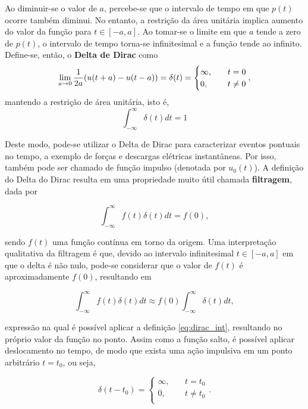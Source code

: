 \documentclass{article}
\numberwithin{equation}{section}
\begin{document}
\begin{itemize}
    Ao diminuir-se o valor de $a$, percebe-se que o intervalo de tempo em que $p(t)$ ocorre também diminui. No entanto, a restrição da área unitária implica aumento do valor da função para $t \in [-a,a]$. Ao tomar-se o limite em que $a$ tende a zero de $p(t)$, o intervalo de tempo torna-se infinitesimal e a função tende ao infinito.
    Define-se, então, o \textbf{Delta de Dirac} como
    \begin{equation}
        \operatornamewithlimits{lim}_{a \to 0} \dfrac{1}{2a}(u(t+a) - u(t-a)) = \delta(t) =
        \begin{cases}
            \infty, &\quad t=0 \\
            0, &\quad t\neq 0 \\
        \end{cases}, \label{eq:dirac_def}
    \end{equation}
    \noindent mantendo a restrição de área unitária, isto é,
    \begin{equation}
            \displaystyle{\int_{-\infty}^{\infty}{\delta(t)dt}} = 1 \label{eq:dirac_int}
    \end{equation}

    Deste modo, pode-se utilizar o Delta de Dirac para caracterizar eventos pontuais no tempo, a exemplo de forças e descargas elétricas instantâneas. Por isso, também pode ser chamado de função impulso (denotada por $u_0(t)$). A definição do Delta do Dirac resulta em uma propriedade muito útil chamada \textbf{filtragem}, dada por

    $$
        \displaystyle{\int_{-\infty}^{\infty}{f(t)\delta(t)dt}} = f(0),
    $$

    \noindent sendo $f(t)$ uma função contínua em torno da origem. Uma interpretação qualitativa da filtragem é que, devido ao intervalo infinitesimal $t \in [-a,a]$ em que o delta é não nulo, pode-se considerar que o valor de $f(t)$ é aproximadamente $f(0)$, resultando em

    $$
        \displaystyle{\int_{-\infty}^{\infty}{f(t)\delta(t)dt}} \approx
        f(0) \displaystyle{\int_{-\infty}^{\infty}{\delta(t)dt}},
    $$

    \noindent expressão na qual é possível aplicar a definição \eqref{eq:dirac_int}, resultando no próprio valor da função no ponto. Assim como a função salto, é possível aplicar deslocamento no tempo, de modo que exista uma ação impulsiva em um ponto arbitrário $t=t_0$, ou seja,

    $$\delta(t-t_0) =
        \begin{cases}
            \infty, &\quad t=t_0 \\
            0, &\quad t\neq t_0 \\
        \end{cases}.
        $$


\end{itemize}
\end{document}
